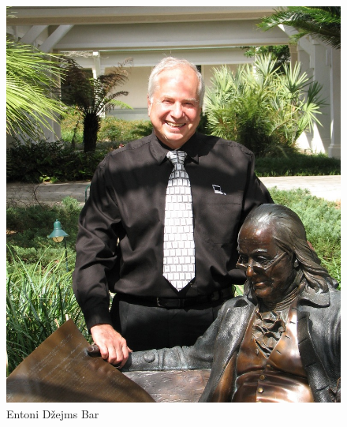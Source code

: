 \documentclass[a4paper]{article}
\begin{document}
{
		
		\begin{figure}[h!]
			\begin{center}
				\includegraphics[scale=0.7]{TonyBarr.jpg}
			\end{center}
			\caption{Entoni Džejms Bar}
		\end{figure}
		

		\newpage
		
	


}
\end{document}
